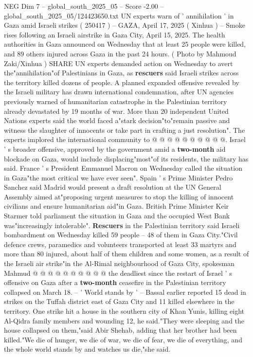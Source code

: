 \begin{textsample}{NEG Dim 7 – global\_south\_2025\_05 – Score -2.00 – global\_south\_2025\_05/124423650.txt}  \label{ex:f7_neg_009}
UN experts warn of ' annihilation ' in Gaza amid Israeli strikes ( 250417 ) -- GAZA, April 17, 2025 ( Xinhua ) -- Smoke rises following an Israeli airstrike in Gaza City, April 15, 2025.
The health authorities in Gaza announced on Wednesday that at least 25 people were killed, and 89 others injured across Gaza in the past 24 hours. ( Photo by Mahmoud Zaki/Xinhua ) SHARE UN experts demanded action on Wednesday to avert the"annihilation"of Palestinians in Gaza, as \textbf{rescuers} said Israeli strikes across the territory killed dozens of people.
A planned expanded offensive revealed by the Israeli military has drawn international condemnation, after UN agencies previously warned of humanitarian catastrophe in the Palestinian territory already devastated by 19 months of war.
More than 20 independent United Nations experts said the world faced a"stark decision"to"remain passive and witness the slaughter of innocents or take part in crafting a just resolution".
The experts implored the international community to @ @ @ @ @ @ @ @ @ @.
Israel ' s broader offensive, approved by the government amid a \textbf{two-month} aid blockade on Gaza, would include displacing"most"of its residents, the military has said.
France ' s President Emmanuel Macron on Wednesday called the situation in Gaza"the most critical we have ever seen".
Spain ' s Prime Minister Pedro Sanchez said Madrid would present a draft resolution at the UN General Assembly aimed at"proposing urgent measures to stop the killing of innocent civilians and ensure humanitarian aid"in Gaza.
British Prime Minister Keir Starmer told parliament the situation in Gaza and the occupied West Bank was"increasingly intolerable". \textbf{Rescuers} in the Palestinian territory said Israeli bombardment on Wednesday killed 59 people -- 48 of them in Gaza City."Civil defence crews, paramedics and volunteers transported at least 33 martyrs and more than 80 injured, about half of them children and some women, as a result of the Israeli air strike"in the Al-Rimal neighbourhood of Gaza City, spokesman Mahmud @ @ @ @ @ @ @ @ @ @ the deadliest since the restart of Israel ' s offensive on Gaza after a \textbf{two-month} ceasefire in the Palestinian territory collapsed on March 18. -- ' World stands by ' -- Bassal earlier reported 15 dead in strikes on the Tuffah district east of Gaza City and 11 killed elsewhere in the territory.
One strike hit a house in the southern city of Khan Yunis, killing eight Al-Qidra family members and wounding 12, he said."They were sleeping and the house collapsed on them,"said Abir Shehab, adding that her brother had been killed."We die of hunger, we die of war, we die of fear, we die of everything, and the whole world stands by and watches us die,"she said.

\end{textsample}

